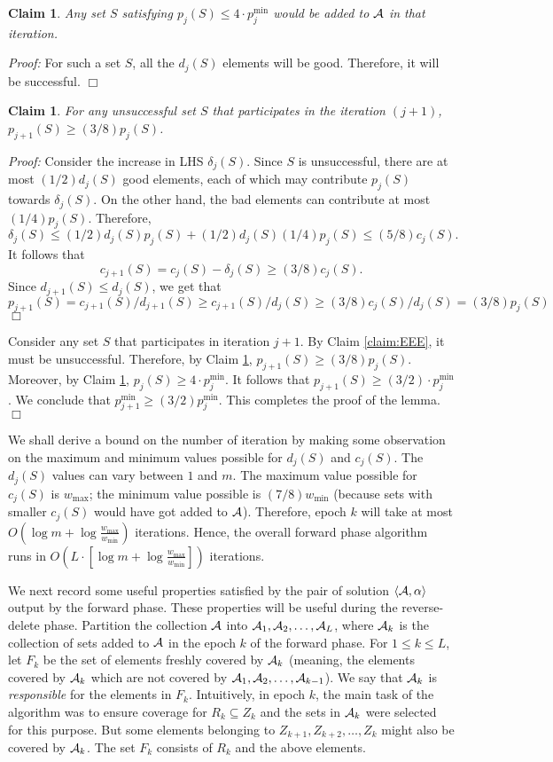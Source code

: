 \documentclass[11pt]{article}
\newtheorem{claim}[theorem]{\bf Claim}
\newcommand {\myproof} {{\it Proof: }}
\newcommand {\qed} {\hfill$\Box$}
\newcommand{\calA} {{\cal A}}
\newcommand{\pair}[2] {\langle #1, #2\rangle}
\begin{document}
\begin{claim}
\label{claim:FFF}
Any set $S$ satisfying $p_j(S)\leq 4\cdot p_j^{\min}$ would be added to $\calA$ in that iteration.
\end{claim}
\myproof 
For such a set $S$, all the $d_j(S)$ elements will be good. Therefore, it will be successful.
\qed

\begin{claim}
\label{claim:GGG}
For any unsuccessful set $S$ that participates in the iteration $(j+1)$,
$p_{j+1}(S) \geq (3/8) p_j(S)$.
\end{claim}
\myproof
Consider the increase in LHS $\delta_j(S)$.
Since $S$ is unsuccessful, there are at most $(1/2)d_j(S)$ good elements,
each of which may contribute $p_j(S)$ towards $\delta_j(S)$.
On the other hand, the bad elements can contribute at most $(1/4)p_j(S)$.
Therefore,
\[
\delta_j(S) \leq (1/2)d_j(S)p_j(S) + (1/2)d_j(S)(1/4)p_j(S) \leq (5/8)c_j(S).
\]
It follows that
\[
c_{j+1}(S) = c_j(S) - \delta_j(S) \geq (3/8)c_j(S).
\]
Since $d_{j+1}(S) \leq d_j(S)$, we get that
\[
p_{j+1}(S) = c_{j+1}(S)/d_{j+1}(S) \geq c_{j+1}(S)/d_j(S) \geq (3/8)c_j(S)/d_j(S)=(3/8)p_j(S)
\]
\qed

Consider any set $S$ that participates in iteration $j+1$.
By Claim \ref{claim:EEE}, it must be unsuccessful. Therefore, by Claim \ref{claim:GGG},
$p_{j+1}(S) \geq (3/8) p_j(S)$. Moreover, by Claim \ref{claim:FFF}, $p_j(S) \geq 4\cdot p_j^{\min}$. 
It follows that $p_{j+1}(S) \geq (3/2)\cdot p_j^{\min}$.
We conclude that $p_{j+1}^{\min} \geq (3/2) p_j^{\min}$.
This completes the proof of the lemma.
\qed

We shall derive a bound on the number of iteration by making some observation on the maximum and minimum values possible
for $d_j(S)$ and $c_j(S)$.
The $d_j(S)$ values can vary between $1$ and $m$.
The maximum value possible for $c_j(S)$ is $w_{\max}$; 
the minimum value possible is $(7/8)w_{\min}$ 
(because sets with smaller $c_j(S)$ would have got added to $\calA$).
Therefore,  epoch $k$ will take at most 
$O(\log m + \log \frac{w_{\max}} {w_{\min}} )$ iterations.
Hence, the overall forward phase algorithm runs in 
$O(L\cdot [\log m + \log \frac{w_{\max}} {w_{\min}}])$ iterations.

We next record some useful properties satisfied by the pair of solution $\pair{\calA}{\alpha}$
output by the forward phase. These properties will be useful during the reverse-delete phase.
Partition the collection $\calA$ into $\calA_1, \calA_2, \ldots, \calA_L$, where $\calA_k$ is the
collection of sets added to $\calA$ in the epoch $k$ of the forward phase.
For $1\leq k\leq L$, let $F_k$ be the set of elements freshly covered by $\calA_k$ (meaning, the elements
covered by $\calA_k$ which are not covered by $\calA_1, \calA_2, \ldots, \calA_{k-1}$).
We say that $\calA_k$ is {\em responsible} for the elements in $F_k$.
Intuitively, in epoch $k$, the main task of the algorithm was to ensure coverage for $R_k\subseteq Z_k$
and the sets in $\calA_k$ were selected for this purpose. But some elements
belonging to $Z_{k+1}, Z_{k+2}, \ldots, Z_k$ might also be covered by $\calA_k$.
The set $F_k$ consists of $R_k$ and the above elements.
\end{document}
